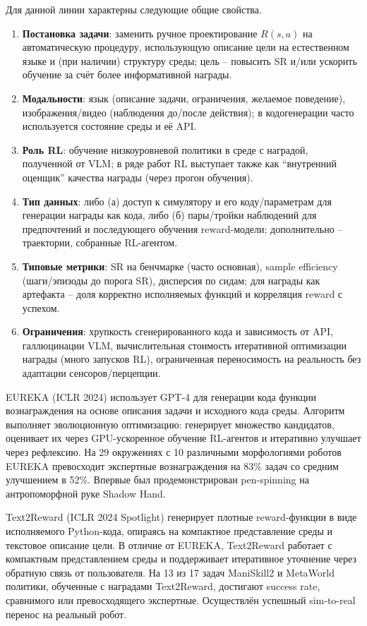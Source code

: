     Для данной линии характерны следующие общие свойства.
    \begin{enumerate}
        \item \textbf{Постановка задачи}: заменить ручное проектирование $R(s,a)$ на автоматическую процедуру, использующую описание цели на естественном языке и (при наличии) структуру среды; цель -- повысить SR и/или ускорить обучение за счёт более информативной награды.
        \item \textbf{Модальности}: язык (описание задачи, ограничения, желаемое поведение), изображения/видео (наблюдения до/после действия); в кодогенерации часто используется состояние среды и её API.
        \item \textbf{Роль RL}: обучение низкоуровневой политики в среде с наградой, полученной от VLM; в ряде работ RL выступает также как ``внутренний оценщик'' качества награды (через прогон обучения).
        \item \textbf{Тип данных}: либо (а) доступ к симулятору и его коду/параметрам для генерации награды как кода, либо (б) пары/трой\-ки наблюдений для предпочтений и последующего обучения reward-модели; дополнительно -- траектории, собранные RL-агентом.
        \item \textbf{Типовые метрики}: SR на бенчмарке (часто основная), sample efficiency (шаги/эпизоды до порога SR), дисперсия по сидам; для награды как артефакта -- доля корректно исполняемых функций и корреляция reward с успехом.
        \item \textbf{Ограничения}: хрупкость сгенерированного кода и зависимость от API, галлюцинации VLM, вычислительная стоимость итеративной оптимизации награды (много запусков RL), ограниченная переносимость на реальность без адаптации сенсоров/перцепции.
    \end{enumerate}

    EUREKA \cite{ma2024eureka} (ICLR 2024) использует GPT-4 для генерации кода функции вознаграждения на основе описания задачи и исходного кода среды. Алгоритм выполняет эволюционную оптимизацию: генерирует множество кандидатов, оценивает их через GPU-ускоренное обучение RL-агентов и итеративно улучшает через рефлексию. На 29 окружениях с 10 различными морфологиями роботов EUREKA превосходит экспертные вознаграждения на 83\% задач со средним улучшением в 52\%. Впервые был продемонстрирован pen-spinning на антропоморфной руке Shadow Hand.

    Text2Reward \cite{xie2024text2reward} (ICLR 2024 Spotlight) генерирует плотные reward-функции в виде исполняемого Python-кода, опираясь на компактное представление среды и текстовое описание цели. В отличие от EUREKA, Text2Reward работает с компактным представлением среды и поддерживает итеративное уточнение через обратную связь от пользователя. На 13 из 17 задач ManiSkill2 и MetaWorld политики, обученные с награ\-дами Text2Reward, достигают success rate, сравнимого или превосходящего экспертные. Осуществлён успешный sim-to-real перенос на реальный робот.

